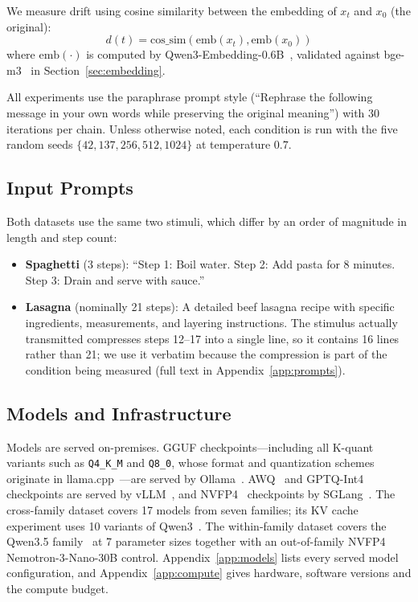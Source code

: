 \documentclass[11pt]{article}
\begin{document}
We measure drift using cosine similarity between the embedding of $x_t$ and
$x_0$ (the original):
\begin{equation}
  d(t) = \text{cos\_sim}(\text{emb}(x_t), \text{emb}(x_0))
\end{equation}
where $\text{emb}(\cdot)$ is computed by
Qwen3-Embedding-0.6B~\citep{zhang2025qwen3embedding}, validated against
bge-m3~\citep{chen2024bgem3} in Section~\ref{sec:embedding}.

All experiments use the paraphrase prompt style (``Rephrase the following message
in your own words while preserving the original meaning'') with 30 iterations per
chain. Unless otherwise noted, each condition is run with the five random seeds
$\{42, 137, 256, 512, 1024\}$ at temperature $0.7$.

\subsection{Input Prompts}
\label{sec:prompts}

Both datasets use the same two stimuli, which differ by an order of magnitude in
length and step count:
\begin{itemize}[leftmargin=*]
  \item \textbf{Spaghetti} (3 steps): ``Step 1: Boil water. Step 2: Add pasta
        for 8 minutes. Step 3: Drain and serve with sauce.''
  \item \textbf{Lasagna} (nominally 21 steps): A detailed beef lasagna recipe with
        specific ingredients, measurements, and layering instructions. The
        stimulus actually transmitted compresses steps 12--17 into a single
        line, so it contains 16 lines rather than 21; we use it verbatim
        because the compression is part of the condition being measured
        (full text in Appendix~\ref{app:prompts}).
\end{itemize}

\subsection{Models and Infrastructure}
\label{sec:models}

Models are served on-premises. GGUF checkpoints---including all K-quant
variants such as \texttt{Q4\_K\_M} and \texttt{Q8\_0}, whose format and
quantization schemes originate in llama.cpp~\citep{gerganov_llamacpp}---are
served by Ollama~\citep{ollama}. AWQ~\citep{lin2024awq} and
GPTQ-Int4~\citep{frantar2023gptq} checkpoints are served by
vLLM~\citep{kwon2023vllm}, and NVFP4~\citep{nvidia2025nvfp4} checkpoints by
SGLang~\citep{zheng2024sglang}. The cross-family dataset covers 17 models from
seven families; its KV cache experiment uses 10 variants of
Qwen3~\citep{yang2025qwen3}. The within-family dataset covers the Qwen3.5
family~\citep{qwen2026qwen35} at 7 parameter sizes together with an
out-of-family NVFP4 Nemotron-3-Nano-30B control. Appendix~\ref{app:models}
lists every served model configuration, and Appendix~\ref{app:compute} gives
hardware, software versions and the compute budget.
\end{document}
